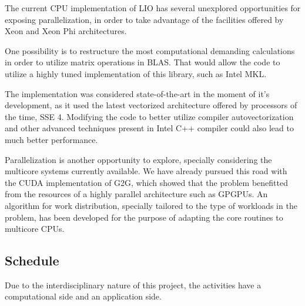 \documentclass[a4paper,10pt]{article}
\begin{document}

The current CPU implementation of LIO has several unexplored opportunities for exposing parallelization, in order to take advantage of the facilities offered by Xeon and Xeon Phi architectures.

One possibility is to restructure the most computational demanding calculations in order to utilize matrix operations in BLAS. That would allow the code to utilize a highly tuned implementation of this library, such as Intel MKL.

The implementation was considered state-of-the-art in the moment of it's development, as it used the latest vectorized architecture offered by processors of the time, SSE 4. 
Modifying the code to better utilize compiler autovectorization and other advanced techniques present in Intel C++ compiler could also lead to much better performance.

Parallelization is another opportunity to explore, specially considering the multicore systems currently available. We have already pursued this road with the CUDA implementation of G2G, which showed that the problem benefitted from the resources of a highly parallel architecture such as GPGPUs. 
An algorithm for work distribution, specially tailored to the type of workloads in the problem, has been developed for the purpose of adapting the core routines to multicore CPUs.


\subsection{Schedule}

Due to the interdisciplinary nature of this project, the activities have a computational side and an application side.
\end{document}
